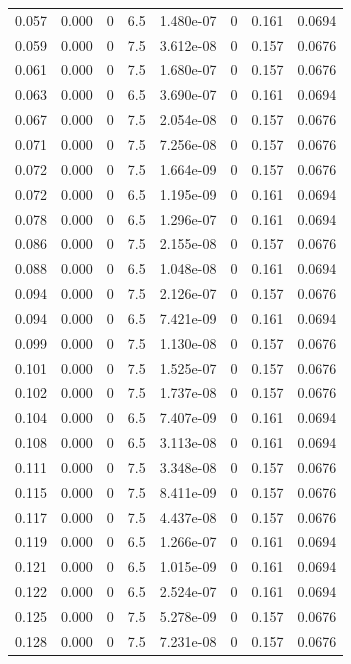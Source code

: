 \documentclass[preview]{standalone}
\begin{document}
{{\begin{tabular}{L{1.2cm}C{1.2cm} C{0.3cm}C{0.5cm} C{1.4cm}C{1.4cm} C{1.4cm}C{1.4cm}}
  0.057  &  0.000  & 0     & 6.5 &  1.480e-07  & 0  & 0.161 &  0.0694   \\ 
  0.059  &  0.000  & 0     & 7.5 &  3.612e-08  & 0  & 0.157 &  0.0676   \\ 
  0.061  &  0.000  & 0     & 7.5 &  1.680e-07  & 0  & 0.157 &  0.0676   \\ 
  0.063  &  0.000  & 0     & 6.5 &  3.690e-07  & 0  & 0.161 &  0.0694   \\ 
  0.067  &  0.000  & 0     & 7.5 &  2.054e-08  & 0  & 0.157 &  0.0676   \\ 
  0.071  &  0.000  & 0     & 7.5 &  7.256e-08  & 0  & 0.157 &  0.0676   \\ 
  0.072  &  0.000  & 0     & 7.5 &  1.664e-09  & 0  & 0.157 &  0.0676   \\ 
  0.072  &  0.000  & 0     & 6.5 &  1.195e-09  & 0  & 0.161 &  0.0694   \\ 
  0.078  &  0.000  & 0     & 6.5 &  1.296e-07  & 0  & 0.161 &  0.0694   \\ 
  0.086  &  0.000  & 0     & 7.5 &  2.155e-08  & 0  & 0.157 &  0.0676   \\ 
  0.088  &  0.000  & 0     & 6.5 &  1.048e-08  & 0  & 0.161 &  0.0694   \\ 
  0.094  &  0.000  & 0     & 7.5 &  2.126e-07  & 0  & 0.157 &  0.0676   \\ 
  0.094  &  0.000  & 0     & 6.5 &  7.421e-09  & 0  & 0.161 &  0.0694   \\ 
  0.099  &  0.000  & 0     & 7.5 &  1.130e-08  & 0  & 0.157 &  0.0676   \\ 
  0.101  &  0.000  & 0     & 7.5 &  1.525e-07  & 0  & 0.157 &  0.0676   \\ 
  0.102  &  0.000  & 0     & 7.5 &  1.737e-08  & 0  & 0.157 &  0.0676   \\ 
  0.104  &  0.000  & 0     & 6.5 &  7.407e-09  & 0  & 0.161 &  0.0694   \\ 
  0.108  &  0.000  & 0     & 6.5 &  3.113e-08  & 0  & 0.161 &  0.0694   \\ 
  0.111  &  0.000  & 0     & 7.5 &  3.348e-08  & 0  & 0.157 &  0.0676   \\ 
  0.115  &  0.000  & 0     & 7.5 &  8.411e-09  & 0  & 0.157 &  0.0676   \\ 
  0.117  &  0.000  & 0     & 7.5 &  4.437e-08  & 0  & 0.157 &  0.0676   \\ 
  0.119  &  0.000  & 0     & 6.5 &  1.266e-07  & 0  & 0.161 &  0.0694   \\ 
  0.121  &  0.000  & 0     & 6.5 &  1.015e-09  & 0  & 0.161 &  0.0694   \\ 
  0.122  &  0.000  & 0     & 6.5 &  2.524e-07  & 0  & 0.161 &  0.0694   \\ 
  0.125  &  0.000  & 0     & 7.5 &  5.278e-09  & 0  & 0.157 &  0.0676   \\ 
  0.128  &  0.000  & 0     & 7.5 &  7.231e-08  & 0  & 0.157 &  0.0676   \\ 
\hline 
\end{tabular} 

}}
\end{document}
